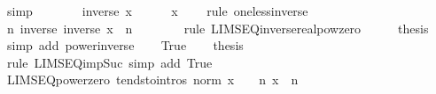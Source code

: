 \begin{isabellebody}
\ simp\isanewline
\ \ \isamarkupfalse%
\ \isamarkupfalse%
\ {\isachardoublequoteopen}{}\ {\isacharless}{\kern0pt}\ inverse\ x{\isachardoublequoteclose}\isanewline
\ \ \ \ \isamarkupfalse%
\ {\isacartoucheopen}x\ {\isacharless}{\kern0pt}\ {}{\isacartoucheclose}\ \isamarkupfalse%
\ {\isacharparenleft}{\kern0pt}rule\ one{\isacharunderscore}{\kern0pt}less{\isacharunderscore}{\kern0pt}inverse{\isacharparenright}{\kern0pt}\isanewline
\ \ \isamarkupfalse%
\ \isamarkupfalse%
\ {\isachardoublequoteopen}{\isacharparenleft}{\kern0pt}{\isasymlambda}n{\isachardot}{\kern0pt}\ inverse\ {\isacharparenleft}{\kern0pt}inverse\ x\ {\isacharcircum}{\kern0pt}\ n{\isacharparenright}{\kern0pt}{\isacharparenright}{\kern0pt}\ {\isasymlonglonglongrightarrow}\ {}{\isachardoublequoteclose}\isanewline
\ \ \ \ \isamarkupfalse%
\ {\isacharparenleft}{\kern0pt}rule\ LIMSEQ{\isacharunderscore}{\kern0pt}inverse{\isacharunderscore}{\kern0pt}realpow{\isacharunderscore}{\kern0pt}zero{\isacharparenright}{\kern0pt}\isanewline
\ \ \isamarkupfalse%
\ \isamarkupfalse%
\ {\isacharquery}{\kern0pt}thesis\ \isamarkupfalse%
\ {\isacharparenleft}{\kern0pt}simp\ add{\isacharcolon}{\kern0pt}\ power{\isacharunderscore}{\kern0pt}inverse{\isacharparenright}{\kern0pt}\isanewline
{}\isamarkupfalse%
\isanewline
\ \ \isamarkupfalse%
\ True\isanewline
\ \ \isamarkupfalse%
\ {\isacharquery}{\kern0pt}thesis\isanewline
\ \ \ \ \isamarkupfalse%
\ {\isacharparenleft}{\kern0pt}rule\ LIMSEQ{\isacharunderscore}{\kern0pt}imp{\isacharunderscore}{\kern0pt}Suc{\isacharparenright}{\kern0pt}\ {\isacharparenleft}{\kern0pt}simp\ add{\isacharcolon}{\kern0pt}\ True{\isacharparenright}{\kern0pt}\isanewline
{}\isamarkupfalse%
%
\endisatagproof
{\isafoldproof}%
%
\isadelimproof
\isanewline
%
\endisadelimproof
\isanewline
{}\isamarkupfalse%
\ LIMSEQ{\isacharunderscore}{\kern0pt}power{\isacharunderscore}{\kern0pt}zero\ {\isacharbrackleft}{\kern0pt}tendsto{\isacharunderscore}{\kern0pt}intros{\isacharbrackright}{\kern0pt}{\isacharcolon}{\kern0pt}\ {\isachardoublequoteopen}norm\ x\ {\isacharless}{\kern0pt}\ {}\ {\isasymLongrightarrow}\ {\isacharparenleft}{\kern0pt}{\isasymlambda}n{\isachardot}{\kern0pt}\ x\ {\isacharcircum}{\kern0pt}\ n{\isacharparenright}{\kern0pt}\ {\isasymlonglonglongrightarrow}\ {}{\isachardoublequoteclose}\isanewline

\end{isabellebody}
